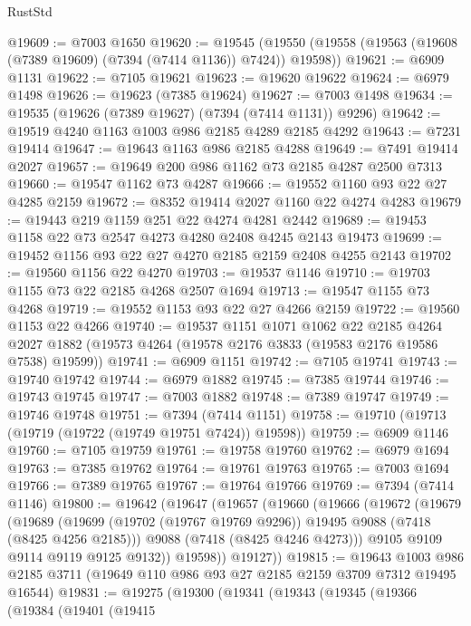\begin{lexlean}{RustStd}
\begin{coremodule}
@19609 := @7003 @1650
@19620 := @19545
    (@19550 (@19558 (@19563 (@19608 (@7389 @19609) (@7394 (@7414 @1136)) @7424)) @19598))
@19621 := @6909 @1131
@19622 := @7105 @19621
@19623 := @19620 @19622
@19624 := @6979 @1498
@19626 := @19623 (@7385 @19624)
@19627 := @7003 @1498
@19634 := @19535 (@19626 (@7389 @19627) (@7394 (@7414 @1131)) @9296)
@19642 := @19519 @4240 @1163 @1003 @986 @2185 @4289 @2185 @4292
@19643 := @7231 @19414
@19647 := @19643 @1163 @986 @2185 @4288
@19649 := @7491 @19414 @2027
@19657 := @19649 @200 @986 @1162 @73 @2185 @4287 @2500 @7313
@19660 := @19547 @1162 @73 @4287
@19666 := @19552 @1160 @93 @22 @27 @4285 @2159
@19672 := @8352 @19414 @2027 @1160 @22 @4274 @4283
@19679 := @19443 @219 @1159 @251 @22 @4274 @4281 @2442
@19689 := @19453 @1158 @22 @73 @2547 @4273 @4280 @2408 @4245 @2143 @19473
@19699 := @19452 @1156 @93 @22 @27 @4270 @2185 @2159 @2408 @4255 @2143
@19702 := @19560 @1156 @22 @4270
@19703 := @19537 @1146
@19710 := @19703 @1155 @73 @22 @2185 @4268 @2507 @1694
@19713 := @19547 @1155 @73 @4268
@19719 := @19552 @1153 @93 @22 @27 @4266 @2159
@19722 := @19560 @1153 @22 @4266
@19740 := @19537
    @1151
    @1071
    @1062
    @22
    @2185
    @4264
    @2027
    @1882
    (@19573 @4264 (@19578 @2176 @3833 (@19583 @2176 @19586 @7538) @19599))
@19741 := @6909 @1151
@19742 := @7105 @19741
@19743 := @19740 @19742
@19744 := @6979 @1882
@19745 := @7385 @19744
@19746 := @19743 @19745
@19747 := @7003 @1882
@19748 := @7389 @19747
@19749 := @19746 @19748
@19751 := @7394 (@7414 @1151)
@19758 := @19710 (@19713 (@19719 (@19722 (@19749 @19751 @7424)) @19598))
@19759 := @6909 @1146
@19760 := @7105 @19759
@19761 := @19758 @19760
@19762 := @6979 @1694
@19763 := @7385 @19762
@19764 := @19761 @19763
@19765 := @7003 @1694
@19766 := @7389 @19765
@19767 := @19764 @19766
@19769 := @7394 (@7414 @1146)
@19800 := @19642
    (@19647
      (@19657
        (@19660
          (@19666
            (@19672
              (@19679
                (@19689
                  (@19699 (@19702 (@19767 @19769 @9296)) @19495 @9088 (@7418 (@8425 @4256 @2185)))
                  @9088
                  (@7418 (@8425 @4246 @4273)))
                @9105
                @9109
                @9114
                @9119
                @9125
                @9132))
            @19598))
        @19127))
@19815 := @19643
    @1003
    @986
    @2185
    @3711
    (@19649 @110 @986 @93 @27 @2185 @2159 @3709 @7312 @19495 @16544)
@19831 := @19275
    (@19300
      (@19341
        (@19343
          (@19345
            (@19366
              (@19384
                (@19401
                  (@19415

\end{coremodule}
\end{lexlean}
